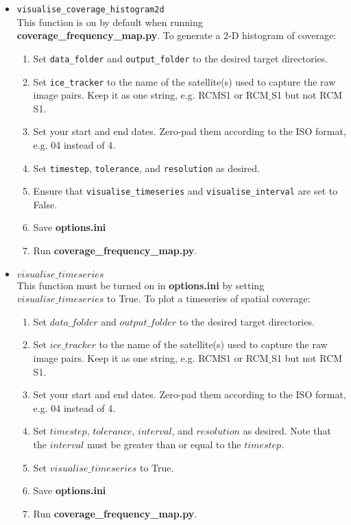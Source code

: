 \documentclass{article}
\begin{document}
        \begin{itemize}
            \item{} \verb?visualise_coverage_histogram2d? \\
            This function is on by default when running \textbf{coverage\_frequency\_map.py}. To generate a 2-D histogram of coverage:
            \begin{enumerate}
                \item Set \verb?data_folder? and \verb?output_folder? to the desired target directories.
                \item Set \verb?ice_tracker? to the name of the satellite(s) used to capture the raw image pairs. Keep it as one string, e.g. RCMS1 or RCM$\_$S1 but not RCM S1.
                \item Set your start and end dates. Zero-pad them according to the ISO format, e.g. 04 instead of 4.
                \item Set \verb?timestep?, \verb?tolerance?, and \verb?resolution? as desired.
                \item Ensure that \verb?visualise_timeseries? and \verb?visualise_interval? are set to False.
                \item Save \textbf{options.ini}
                \item Run \textbf{coverage\_frequency\_map.py}.
            \end{enumerate}

            \item{} $visualise\_timeseries$ \\
            This function must be turned on in \textbf{options.ini} by setting $visualise\_timeseries$ to True. To plot a timeseries of spatial coverage:
            \begin{enumerate}
                \item Set $data\_folder$ and $output\_folder$ to the desired target directories.
                \item Set $ice\_tracker$ to the name of the satellite(s) used to capture the raw image pairs. Keep it as one string, e.g. RCMS1 or RCM$\_$S1 but not RCM S1.
                \item Set your start and end dates. Zero-pad them according to the ISO format, e.g. 04 instead of 4.
                \item Set $timestep$, $tolerance$, $interval$, and $resolution$ as desired. Note that the $interval$ must be greater than or equal to the $timestep$.
                \item Set $visualise\_timeseries$ to True.
                \item Save \textbf{options.ini}
                \item Run \textbf{coverage\_frequency\_map.py}.
            \end{enumerate}


\end{itemize}
\end{document}

